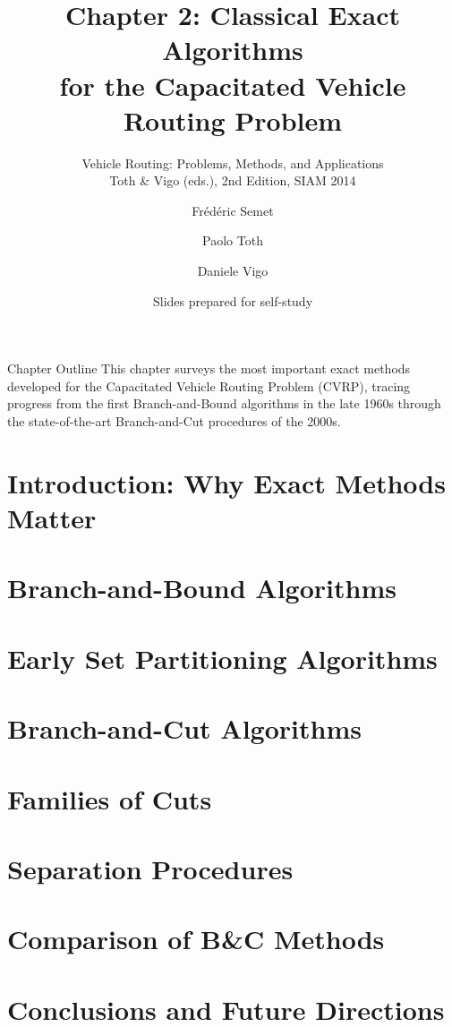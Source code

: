 \documentclass[aspectratio=169,10pt]{beamer}
\title[Ch.2: Classical Exact CVRP]{%
  \textbf{Chapter 2: Classical Exact Algorithms\\
  for the Capacitated Vehicle Routing Problem}}
\subtitle{Vehicle Routing: Problems, Methods, and Applications\\
          Toth \& Vigo (eds.), 2nd Edition, SIAM 2014}
\author{Fr\'ed\'eric Semet \and Paolo Toth \and Daniele Vigo}
\date{Slides prepared for self-study}
\begin{document}

\begin{frame}
  \titlepage
\end{frame}

\begin{frame}[allowframebreaks]{Chapter Outline}
  This chapter surveys the most important exact methods developed
  for the Capacitated Vehicle Routing Problem (CVRP), tracing progress
  from the first Branch-and-Bound algorithms in the late 1960s through
  the state-of-the-art Branch-and-Cut procedures of the 2000s.

  \bigskip
  \tableofcontents
\end{frame}


\section{Introduction: Why Exact Methods Matter}
\section{Branch-and-Bound Algorithms}
\section{Early Set Partitioning Algorithms}
\section{Branch-and-Cut Algorithms}
\section{Families of Cuts}
\section{Separation Procedures}
\section{Comparison of B\&C Methods}
\section{Conclusions and Future Directions}
\end{document}
